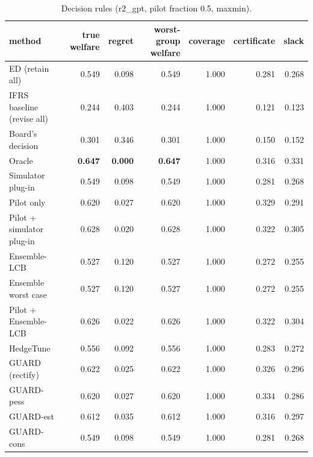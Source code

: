 \begin{table}[t]
\centering
\small
\begin{tabular}{lrrrrrr}
\toprule
method & true welfare & regret & worst-group welfare & coverage & certificate & slack \\
\midrule
ED (retain all) & 0.549 & 0.098 & 0.549 & 1.000 & 0.281 & 0.268 \\
IFRS baseline (revise all) & 0.244 & 0.403 & 0.244 & 1.000 & 0.121 & 0.123 \\
Board's decision & 0.301 & 0.346 & 0.301 & 1.000 & 0.150 & 0.152 \\
Oracle & \textbf{0.647} & \textbf{0.000} & \textbf{0.647} & 1.000 & 0.316 & 0.331 \\
Simulator plug-in & 0.549 & 0.098 & 0.549 & 1.000 & 0.281 & 0.268 \\
Pilot only & 0.620 & 0.027 & 0.620 & 1.000 & 0.329 & 0.291 \\
Pilot + simulator plug-in & 0.628 & 0.020 & 0.628 & 1.000 & 0.322 & 0.305 \\
Ensemble-LCB & 0.527 & 0.120 & 0.527 & 1.000 & 0.272 & 0.255 \\
Ensemble worst case & 0.527 & 0.120 & 0.527 & 1.000 & 0.272 & 0.255 \\
Pilot + Ensemble-LCB & 0.626 & 0.022 & 0.626 & 1.000 & 0.322 & 0.304 \\
HedgeTune & 0.556 & 0.092 & 0.556 & 1.000 & 0.283 & 0.272 \\
GUARD (rectify) & 0.622 & 0.025 & 0.622 & 1.000 & 0.326 & 0.296 \\
GUARD-pess & 0.620 & 0.027 & 0.620 & 1.000 & 0.334 & 0.286 \\
GUARD-est & 0.612 & 0.035 & 0.612 & 1.000 & 0.316 & 0.297 \\
GUARD-cons & 0.549 & 0.098 & 0.549 & 1.000 & 0.281 & 0.268 \\
\bottomrule
\end{tabular}
\caption{Decision rules (r2\_gpt, pilot fraction 0.5, maxmin).}
\label{tab:methods-maxmin}
\end{table}
